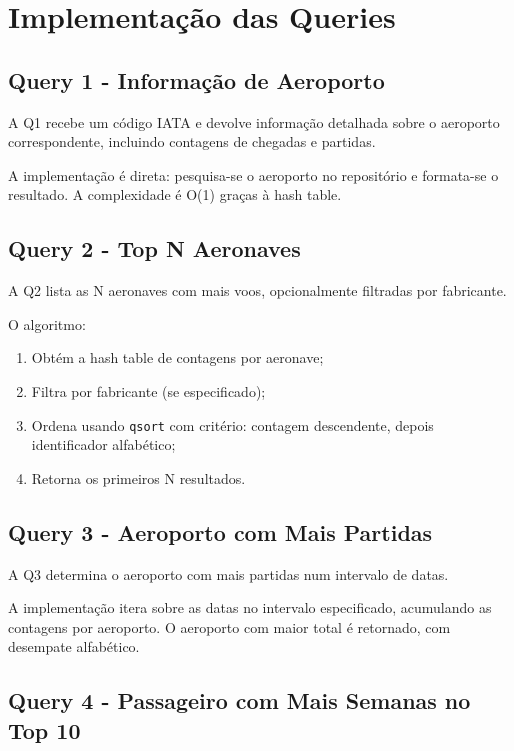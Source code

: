 \documentclass[a4paper,12pt]{scrreprt}
\begin{document}
\chapter{Implementação das Queries}

\section{Query 1 - Informação de Aeroporto}

A Q1 recebe um código IATA e devolve informação detalhada sobre o aeroporto correspondente, incluindo contagens de chegadas e partidas.

A implementação é direta: pesquisa-se o aeroporto no repositório e formata-se o resultado. A complexidade é O(1) graças à hash table.

\section{Query 2 - Top N Aeronaves}

A Q2 lista as N aeronaves com mais voos, opcionalmente filtradas por fabricante.

O algoritmo:
\begin{enumerate}
    \item Obtém a hash table de contagens por aeronave;
    \item Filtra por fabricante (se especificado);
    \item Ordena usando \texttt{qsort} com critério: contagem descendente, depois identificador alfabético;
    \item Retorna os primeiros N resultados.
\end{enumerate}

\section{Query 3 - Aeroporto com Mais Partidas}

A Q3 determina o aeroporto com mais partidas num intervalo de datas.

A implementação itera sobre as datas no intervalo especificado, acumulando as contagens por aeroporto. O aeroporto com maior total é retornado, com desempate alfabético.

\section{Query 4 - Passageiro com Mais Semanas no Top 10}
\end{document}

